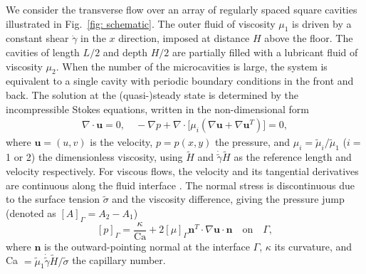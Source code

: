 We consider the transverse flow over an array of regularly spaced square cavities illustrated in Fig.\ \ref{fig: schematic}. The outer fluid of viscosity $\mu_1$ is driven by a constant shear $\dot{\gamma}$ in the $x$ direction, imposed at distance $H$ above the floor. The cavities of length $L/2$ and depth $H/2$ are partially filled with a lubricant fluid of viscosity $\mu_2$. When the number of the microcavities is large, the system is equivalent to a single cavity with periodic boundary conditions in the front and back. The solution at the (quasi-)steady state is determined by the incompressible Stokes equations, written in the non-dimensional form
\begin{equation} \label{Stokes}
  \begin{aligned}
    \nabla \cdot {\bm u} = 0, \quad
    -\nabla p + \nabla \cdot \big[ \mu_i ( \nabla {\bm u} + \nabla {\bm u}^T ) \big] = 0,
  \end{aligned}
\end{equation}
where ${\bm u}=(u,v)$ is the velocity, $p=p(x,y)$ the pressure, and $\mu_i=\tilde{\mu}_i/\tilde{\mu}_1$ ($i=$ 1 or 2) the dimensionless viscosity, using $\tilde{H}$ and $\dot{\tilde{\gamma}} \tilde{H}$ as the reference length and velocity respectively. For viscous flows, the velocity and its tangential derivatives are continuous along the fluid interface \cite{Batchelor}. The normal stress is discontinuous due to the surface tension $\tilde{\sigma}$ and the viscosity difference, giving the pressure jump (denoted as $[A]_\Gamma=A_2-A_1$)
\begin{equation} \label{p jump}
  [p]_\Gamma = \frac{\kappa}{\textrm{Ca}} + 2[\mu]_\Gamma {\bm n}^T \cdot \nabla {\bm u} \cdot {\bm n} 
  \quad \textrm{on} \quad \Gamma,
\end{equation}
where ${\bm n}$ is the outward-pointing normal at the interface $\Gamma$, $\kappa$ its curvature, and Ca $=\tilde{\mu}_1 \dot{\tilde{\gamma}} \tilde{H}/\tilde{\sigma}$ the capillary number. 

